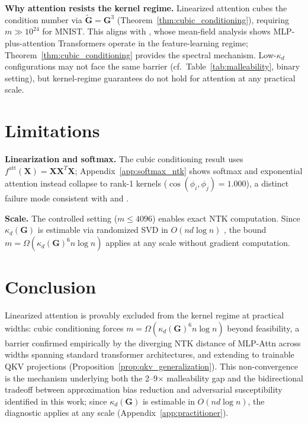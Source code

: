 \documentclass{article}
\theoremstyle{plain}
\theoremstyle{definition}
\theoremstyle{remark}
\begin{document}
\textbf{Why attention resists the kernel regime.} Linearized attention cubes the condition number via $\tilde{\mathbf{G}}=\mathbf{G}^3$ (Theorem~\ref{thm:cubic_conditioning}), requiring $m \gg 10^{24}$ for MNIST. This aligns with \citet{kim2024nonconvex}, whose mean-field analysis shows MLP-plus-attention Transformers operate in the feature-learning regime; Theorem~\ref{thm:cubic_conditioning} provides the spectral mechanism. Low-$\kappa_d$ configurations may not face the same barrier (cf.\ Table~\ref{tab:malleability}, binary setting), but kernel-regime guarantees do not hold for attention at any practical scale.

\section{Limitations}
\label{sec:limitations}

\textbf{Linearization and softmax.} The cubic conditioning result uses $f^{\text{att}}(\mathbf{X}) = \mathbf{X}\mathbf{X}^T\mathbf{X}$; Appendix~\ref{app:softmax_ntk} shows softmax and exponential attention instead collapse to rank-1 kernels ($\cos(\phi_i,\phi_j)=1.000$), a distinct failure mode consistent with \citet{bae2022ifsanswer} and \citet{sakai2025nngp}.

\textbf{Scale.} The controlled setting ($m \leq 4096$) enables exact NTK computation. Since $\kappa_d(\mathbf{G})$ is estimable via randomized SVD in $O(nd\log n)$ \citep{halko2011finding}, the bound $m = \Omega(\kappa_d(\mathbf{G})^6 n\log n)$ applies at any scale without gradient computation.

\section{Conclusion}
\label{sec:conclusion}

Linearized attention is provably excluded from the kernel regime at practical widths: cubic conditioning forces $m = \Omega(\kappa_d(\mathbf{G})^6 n \log n)$ beyond feasibility, a barrier confirmed empirically by the diverging NTK distance of MLP-Attn across widths spanning standard transformer architectures, and extending to trainable QKV projections (Proposition~\ref{prop:qkv_generalization}). This non-convergence is the mechanism underlying both the 2--9$\times$ malleability gap and the bidirectional tradeoff between approximation bias reduction and adversarial susceptibility identified in this work; since $\kappa_d(\mathbf{G})$ is estimable in $O(nd\log n)$, the diagnostic applies at any scale (Appendix~\ref{app:practitioner}).
\end{document}
